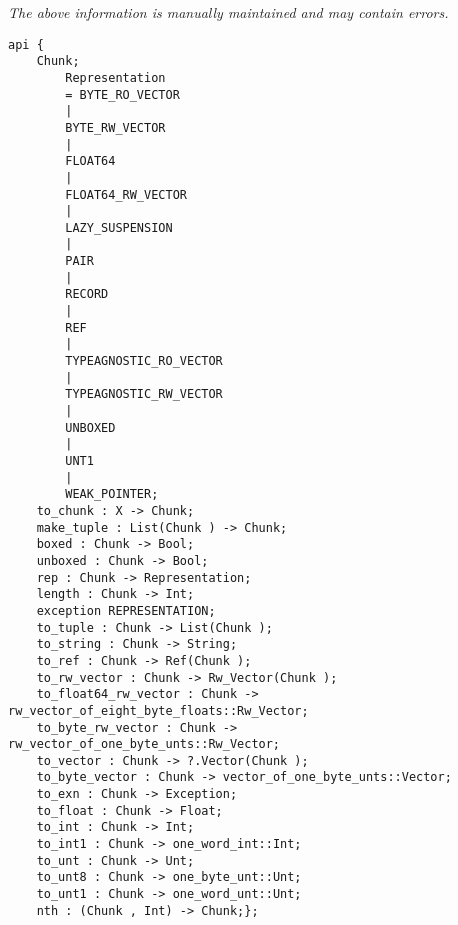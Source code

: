 \label{api:Unsafe\_Chunk}

{\tiny \it The above information is manually maintained and may contain errors.}
\begin{verbatim}
api {
    Chunk;
        Representation
        = BYTE_RO_VECTOR
        |
        BYTE_RW_VECTOR
        |
        FLOAT64
        |
        FLOAT64_RW_VECTOR
        |
        LAZY_SUSPENSION
        |
        PAIR
        |
        RECORD
        |
        REF
        |
        TYPEAGNOSTIC_RO_VECTOR
        |
        TYPEAGNOSTIC_RW_VECTOR
        |
        UNBOXED
        |
        UNT1
        |
        WEAK_POINTER;
    to_chunk : X -> Chunk;
    make_tuple : List(Chunk ) -> Chunk;
    boxed : Chunk -> Bool;
    unboxed : Chunk -> Bool;
    rep : Chunk -> Representation;
    length : Chunk -> Int;
    exception REPRESENTATION;
    to_tuple : Chunk -> List(Chunk );
    to_string : Chunk -> String;
    to_ref : Chunk -> Ref(Chunk );
    to_rw_vector : Chunk -> Rw_Vector(Chunk );
    to_float64_rw_vector : Chunk -> rw_vector_of_eight_byte_floats::Rw_Vector;
    to_byte_rw_vector : Chunk -> rw_vector_of_one_byte_unts::Rw_Vector;
    to_vector : Chunk -> ?.Vector(Chunk );
    to_byte_vector : Chunk -> vector_of_one_byte_unts::Vector;
    to_exn : Chunk -> Exception;
    to_float : Chunk -> Float;
    to_int : Chunk -> Int;
    to_int1 : Chunk -> one_word_int::Int;
    to_unt : Chunk -> Unt;
    to_unt8 : Chunk -> one_byte_unt::Unt;
    to_unt1 : Chunk -> one_word_unt::Unt;
    nth : (Chunk , Int) -> Chunk;};
\end{verbatim}
